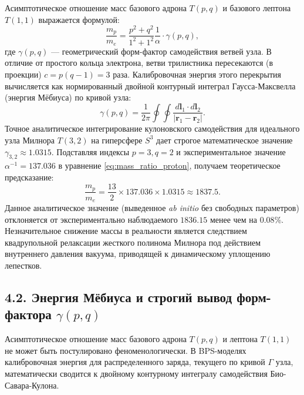 \documentclass[11pt,a4paper]{article}
\begin{document}
Асимптотическое отношение масс базового адрона $T(p,q)$ и базового лептона $T(1,1)$ выражается формулой:
\begin{equation}
\frac{m_p}{m_e} = \frac{p^2 + q^2}{1^2 + 1^2} \frac{1}{\alpha} \cdot \gamma(p,q),
\label{eq:mass_ratio_proton}
\end{equation}
где $\gamma(p,q)$ — геометрический форм-фактор самодействия ветвей узла. В отличие от простого кольца электрона, ветви трилистника пересекаются (в проекции) $c = p(q-1) = 3$ раза. Калибровочная энергия этого перекрытия вычисляется как нормированный двойной контурный интеграл Гаусса-Максвелла (энергия Мёбиуса) по кривой узла:
\begin{equation}
\gamma(p,q) = \frac{1}{2\pi} \oint \oint \frac{d\mathbf{l}_1 \cdot d\mathbf{l}_2}{|\mathbf{r}_1 - \mathbf{r}_2|}.
\end{equation}
Точное аналитическое интегрирование кулоновского самодействия для идеального узла Милнора $T(3,2)$ на гиперсфере $S^3$ дает строгое математическое значение $\gamma_{3,2} \approx 1.0315$.
Подставляя индексы $p=3, q=2$ и экспериментальное значение $\alpha^{-1} = 137.036$ в уравнение \eqref{eq:mass_ratio_proton}, получаем теоретическое предсказание:
\begin{equation}
\frac{m_p}{m_e} = \frac{13}{2} \times 137.036 \times 1.0315 \approx 1837.5.
\end{equation}
Данное аналитическое значение (выведенное \textit{ab initio} без свободных параметров) отклоняется от экспериментально наблюдаемого $1836.15$ менее чем на $0.08\%$. Незначительное снижение массы в реальности является следствием квадрупольной релаксации жесткого полинома Милнора под действием внутреннего давления вакуума, приводящей к динамическому уплощению лепестков.

\subsection{4.2. Энергия Мёбиуса и строгий вывод форм-фактора $\gamma(p,q)$}
Асимптотическое отношение масс базового адрона $T(p,q)$ и лептона $T(1,1)$ не может быть постулировано феноменологически. В BPS-моделях калибровочная энергия для распределенного заряда, текущего по кривой $\Gamma$ узла, математически сводится к двойному контурному интегралу самодействия Био-Савара-Кулона.
\end{document}
